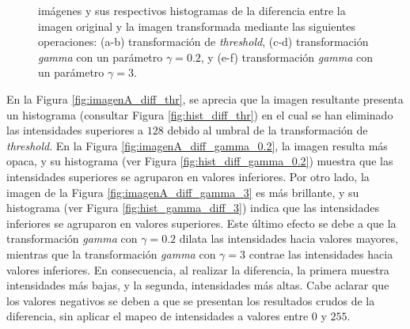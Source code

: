 \documentclass[11pt, twocolumn]{article}
\begin{document}
\begin{figure}[htbp]
  \hfill
  \caption{imágenes y sus respectivos histogramas de la diferencia entre la imagen original y la imagen transformada mediante las siguientes operaciones: (a-b) transformación de \textit{threshold}, (c-d) transformación \textit{gamma} con un parámetro $\gamma = 0.2$, y (e-f) transformación \textit{gamma} con un parámetro $\gamma = 3$.}
  \label{fig:figuras_ej_2_diff}
\end{figure}


En la Figura \ref{fig:imagenA_diff_thr}, se aprecia que la imagen resultante presenta un histograma (consultar Figura \ref{fig:hist_diff_thr}) en el cual se han eliminado las intensidades superiores a $128$ debido al umbral de la transformación de \textit{threshold}. En la Figura \ref{fig:imagenA_diff_gamma_0.2}, la imagen resulta más opaca, y su histograma (ver Figura \ref{fig:hist_diff_gamma_0.2}) muestra que las intensidades superiores se agruparon en valores inferiores. Por otro lado, la imagen de la Figura \ref{fig:imagenA_diff_gamma_3} es más brillante, y su histograma (ver Figura \ref{fig:hist_gamma_diff_3}) indica que las intensidades inferiores se agruparon en valores superiores. Este último efecto se debe a que la transformación \textit{gamma} con $\gamma = 0.2$ dilata las intensidades hacia valores mayores, mientras que la transformación \textit{gamma} con $\gamma = 3$ contrae las intensidades hacia valores inferiores. En consecuencia, al realizar la diferencia, la primera muestra intensidades más bajas, y la segunda, intensidades más altas. Cabe aclarar que los valores negativos se deben a que se presentan los resultados crudos de la diferencia, sin aplicar el mapeo de intensidades a valores entre $0$ y $255$.
\end{document}
